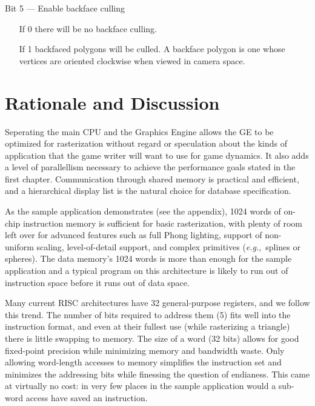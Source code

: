 \documentclass{book}
\begin{document}
\begin{indented}{\sc Bit 5 --- Enable backface culling}
  \begin{itemize}
     \item[If 0] there will be no backface culling.
     \item[If 1] backfaced polygons will be culled.  A backface polygon
       is one whose vertices are oriented clockwise when viewed in camera
       space.
  \end{itemize}
\end{indented}

\chapter{Rationale and Discussion}


Seperating the main CPU and the Graphics Engine allows the GE to be
optimized for rasterization without regard or speculation about the
kinds of application that the game writer will want to use for game
dynamics.  It also adds a level of parallellism necessary to
achieve the performance goals stated in the first chapter.
Communication through shared memory is practical and efficient, and a
hierarchical display list is the natural choice for database
specification.


As the sample application demonstrates (see the appendix), 1024 words of
on-chip instruction memory is sufficient for basic rasterization, with
plenty of room left over for advanced features such as full Phong
lighting, support of non-uniform scaling, level-of-detail support, and
complex primitives ({\em e.g.},~splines or spheres).  The data memory's
1024 words is more than enough for the sample application and a typical
program on this architecture is likely to run out of instruction space
before it runs out of data space.

Many current RISC architectures have 32 general-purpose registers, and we
follow this trend.  The number of bits required to address them (5) fits
well into the instruction format, and even at their fullest use (while
rasterizing a triangle) there is little swapping to memory.  The size
of a word (32 bits) allows for good fixed-point precision while minimizing
memory and bandwidth waste.  Only allowing word-length accesses to memory
simplifies the instruction set and minimizes the addressing bits while
finessing the question of endianess.  This came at virtually no cost:
in very few places in the sample application would a sub-word access
have saved an instruction.
\end{document}
